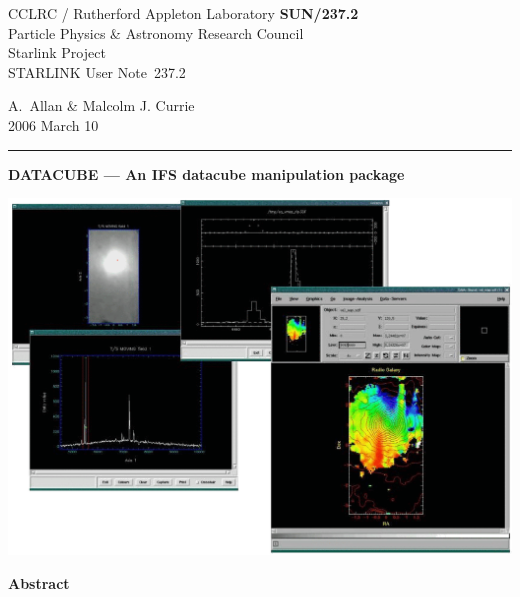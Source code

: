 \documentclass[twoside,11pt]{article}
\newcommand{\stardoccategory}  {STARLINK User Note}
\newcommand{\stardocinitials}  {SUN}
\newcommand{\stardocnumber}    {237.2}
\newcommand{\stardocauthors}   {A.~Allan \& Malcolm J. Currie}
\newcommand{\stardocdate}      {2006 March 10}
\newcommand{\stardoctitle}     {DATACUBE --- An IFS datacube manipulation package}
\newcommand{\stardocname}{\stardocinitials /\stardocnumber}
\newenvironment{latexonly}{}{}
\begin{document}
\thispagestyle{empty}

\begin{latexonly}
   CCLRC / {\sc Rutherford Appleton Laboratory} \hfill {\bf \stardocname}\\
   {\large Particle Physics \& Astronomy Research Council}\\
   {\large Starlink Project\\}
   {\large \stardoccategory\ \stardocnumber}
   \begin{flushright}
   \stardocauthors\\
   \stardocdate
   \end{flushright}
   \vspace{-4mm}
   \rule{\textwidth}{0.5mm}
   \vspace{5mm}
   \begin{center}
   {\Huge\bf  \stardoctitle \\ [2.5ex]}
   \end{center}
   \vspace{5mm}

   \begin{center}
   \includegraphics[scale=0.6]{sun237_cover.eps}
   \end{center}

   \vspace{5mm}
   \begin{center}
      {\Large\bf Abstract}
   \end{center}
\end{latexonly}
\end{document}

